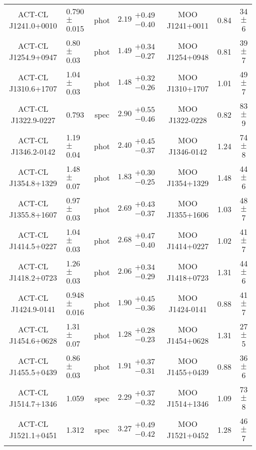 \begin{longtable}[p!]{clccccc}
ACT-CL J1241.0+0010 & 0.790$\pm$ 0.015 & phot & $2.19\substack{+0.49\\-0.40}$ & MOO J1241+0011 & 0.84 & 34$\pm$ 6 \\
ACT-CL J1254.9+0947 & 0.80$\pm$ 0.03 & phot & $1.49\substack{+0.34\\-0.27}$ & MOO J1254+0948 & 0.81 & 39$\pm$ 7 \\
ACT-CL J1310.6+1707 & 1.04$\pm$ 0.03 & phot & $1.48\substack{+0.32\\-0.26}$ & MOO J1310+1707 & 1.01 & 49$\pm$ 7 \\
ACT-CL J1322.9-0227 & 0.793& spec & $2.90\substack{+0.55\\-0.46}$ & MOO J1322-0228 & 0.82 & 83$\pm$ 9 \\
ACT-CL J1346.2-0142 & 1.19$\pm$ 0.04 & phot & $2.40\substack{+0.45\\-0.37}$ & MOO J1346-0142 & 1.24 & 74$\pm$ 8 \\
ACT-CL J1354.8+1329 & 1.48$\pm$ 0.07 & phot & $1.83\substack{+0.30\\-0.25}$ & MOO J1354+1329 & 1.48 & 44$\pm$ 6 \\
ACT-CL J1355.8+1607 & 0.97$\pm$ 0.03 & phot & $2.69\substack{+0.43\\-0.37}$ & MOO J1355+1606 & 1.03 & 48$\pm$ 7 \\
ACT-CL J1414.5+0227 & 1.04$\pm$ 0.03 & phot & $2.68\substack{+0.47\\-0.40}$ & MOO J1414+0227 & 1.02 & 41$\pm$ 7 \\
ACT-CL J1418.2+0723 & 1.26$\pm$ 0.03 & phot & $2.06\substack{+0.34\\-0.29}$ & MOO J1418+0723 & 1.31 & 44$\pm$ 6 \\
ACT-CL J1424.9-0141 & 0.948$\pm$ 0.016 & phot & $1.90\substack{+0.45\\-0.36}$ & MOO J1424-0141 & 0.88 & 41$\pm$ 7 \\
ACT-CL J1454.6+0628 & 1.31$\pm$ 0.07 & phot & $1.28\substack{+0.28\\-0.23}$ & MOO J1454+0628 & 1.31 & 27$\pm$ 5 \\
ACT-CL J1455.5+0439 & 0.86$\pm$ 0.03 & phot & $1.91\substack{+0.37\\-0.31}$ & MOO J1455+0439 & 0.88 & 36$\pm$ 6 \\
ACT-CL J1514.7+1346 & 1.059& spec & $2.29\substack{+0.37\\-0.32}$ & MOO J1514+1346 & 1.09 & 73$\pm$ 8 \\
ACT-CL J1521.1+0451 & 1.312& spec & $3.27\substack{+0.49\\-0.42}$ & MOO J1521+0452 & 1.28 & 46$\pm$ 7 \\

\end{longtable}
